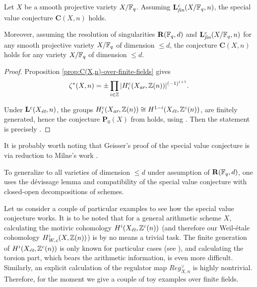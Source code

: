 \documentclass{article}
\numberwithin{equation}{section}
\begin{document}
\begin{theorem}
  \label{thm:C(X,n)-over-finite-fields}
  Let $X$ be a smooth projective variety $X/\FF_q$. Assuming
  $\mathbf{L}_\fin^c (X/\FF_q,n)$, the special value conjecture
  $\mathbf{C} (X,n)$ holds.

  Moreover, assuming the resolution of singularities $\mathbf{R} (\FF_q,d)$ and
  $\mathbf{L}_\fin^c (X/\FF_q,n)$ for any smooth projective variety $X/\FF_q$ of
  dimension $\le d$, the conjecture $\mathbf{C} (X,n)$ holds for any variety
  $X/\FF_q$ of dimension $\le d$.

  \begin{proof}
    Proposition \ref{prop:C(X,n)-over-finite-fields} gives
    \[ \zeta^* (X,n) =
      \pm \prod_{i \in \ZZ} |H_i^c (X_\ar, \ZZ (n))|^{(-1)^{i+1}}. \]

    Under $\mathbf{L}^c (X_\et,n)$, the groups
    $H_i^c (X_\ar, \ZZ(n)) \cong H^{1-i} (X_\et, \ZZ^c (n))$, are finitely
    generated, hence the conjecture $\mathbf{P}_0 (X)$ from
    \cite[\S 4]{Geisser-2010-arithmetic-homology} holds, using
    \cite[Proposition~4.1]{Geisser-2010-arithmetic-homology}.
    Then the statement is precisely
    \cite[Theorem~4.5]{Geisser-2010-arithmetic-homology}.
  \end{proof}
\end{theorem}

\begin{remark}
  It is probably worth noting that Geisser's proof of the special value
  conjecture is via reduction to Milne's work \cite{Milne-1986}.

  To generalize to all varieties of dimension $\le d$ under assumption of
  $\mathbf{R} (\FF_q,d)$, one uses the dévissage lemma
  \cite[Lemma~2.7]{Geisser-2006} and compatibility of the special value
  conjecture with closed-open decompositions of schemes.
\end{remark}

Let us consider a couple of particular examples to see how the special value
conjecture works. It is to be noted that for a general arithmetic scheme $X$,
calculating the motivic cohomology $H^i (X_\et, \ZZ^c (n))$ (and therefore our
Weil-étale cohomology $H^i_\Wc (X, \ZZ(n))$) is by no means a trivial task. The
finite generation of $H^i (X_\et, \ZZ^c (n))$ is only known for particular cases
(see \cite[\S 8]{Beshenov-Weil-etale-1}), and calculating the torsion part,
which bears the arithmetic information, is even more difficult. Similarly, an
explicit calculation of the regulator map $Reg_{X,n}^\vee$ is highly
nontrivial. Therefore, for the moment we give a couple of toy examples over
finite fields.
\end{document}
